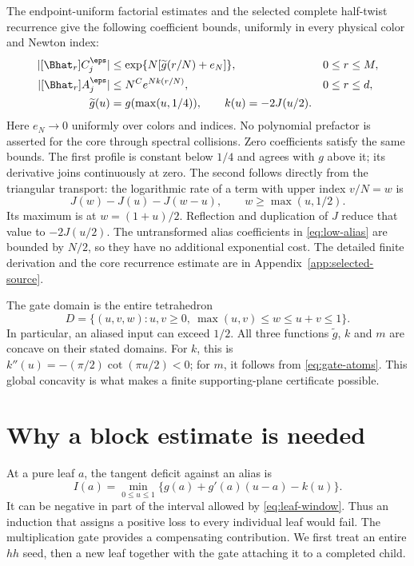 The endpoint-uniform factorial estimates and the selected complete half-twist recurrence give the following coefficient bounds, uniformly in every physical color and Newton index:
\begin{equation}\label{eq:leaf-envelopes}
 \begin{aligned}
 |[\Bhat_r]C_j^\eps|&\le \exp\{N[\widetilde g(r/N)+e_N]\},
       &&0\le r\le M,\\
 |[\Bhat_r]A_j^\eps|&\le N^C e^{Nk(r/N)},
       &&0\le r\le d,\\
 \widetilde g(u)&=g(\max(u,1/4)),\qquad
 k(u)=-2J(u/2).
 \end{aligned}
\end{equation}
Here $e_N\to0$ uniformly over colors and indices. No polynomial prefactor is asserted for the core through spectral collisions. Zero coefficients satisfy the same bounds. The first profile is constant below $1/4$ and agrees with $g$ above it; its derivative joins continuously at zero. The second follows directly from the triangular transport: the logarithmic rate of a term with upper index $v/N=w$ is
\[
 J(w)-J(u)-J(w-u),\qquad w\ge\max(u,1/2).
\]
Its maximum is at $w=(1+u)/2$. Reflection and duplication of $J$ reduce that value to $-2J(u/2)$. The untransformed alias coefficients in \eqref{eq:low-alias} are bounded by $N/2$, so they have no additional exponential cost. The detailed finite derivation and the core recurrence estimate are in Appendix~\ref{app:selected-source}.

The gate domain is the entire tetrahedron
\begin{equation}\label{eq:alias-domain}
 D=\{(u,v,w):u,v\ge0,\ \max(u,v)\le w\le u+v\le1\}.
\end{equation}
In particular, an aliased input can exceed $1/2$. All three functions $\widetilde g$, $k$ and $m$ are concave on their stated domains. For $k$, this is $k''(u)=-(\pi/2)\cot(\pi u/2)<0$; for $m$, it follows from \eqref{eq:gate-atoms}. This global concavity is what makes a finite supporting-plane certificate possible.

\section{Why a block estimate is needed}
At a pure leaf $a$, the tangent deficit against an alias is
\[
 I(a)=\min_{0\le u\le1}\{g(a)+g'(a)(u-a)-k(u)\}.
\]
It can be negative in part of the interval allowed by \eqref{eq:leaf-window}. Thus an induction that assigns a positive loss to every individual leaf would fail. The multiplication gate provides a compensating contribution. We first treat an entire $hh$ seed, then a new leaf together with the gate attaching it to a completed child.

